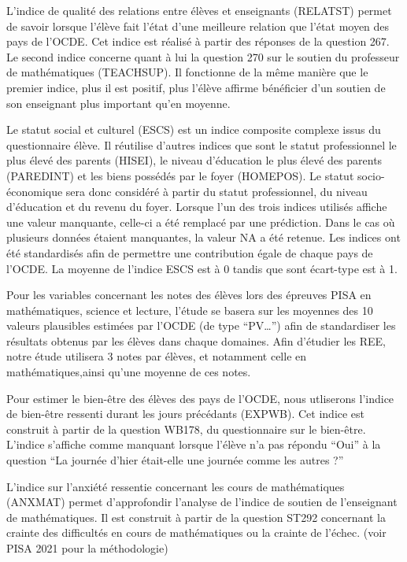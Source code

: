 \documentclass[
  french,
  11pt,
  a4paper,
  oneside]{report}
\begin{document}
L'indice de qualité des relations entre élèves et enseignants (RELATST)
permet de savoir lorsque l'élève fait l'état d'une meilleure relation
que l'état moyen des pays de l'OCDE. Cet indice est réalisé à partir des
réponses de la question 267. Le second indice concerne quant à lui la
question 270 sur le soutien du professeur de mathématiques (TEACHSUP).
Il fonctionne de la même manière que le premier indice, plus il est
positif, plus l'élève affirme bénéficier d'un soutien de son enseignant
plus important qu'en moyenne.

Le statut social et culturel (ESCS) est un indice composite complexe
issus du questionnaire élève. Il réutilise d'autres indices que sont le
statut professionnel le plus élevé des parents (HISEI), le niveau
d'éducation le plus élevé des parents (PAREDINT) et les biens possédés
par le foyer (HOMEPOS). Le statut socio-économique sera donc considéré à
partir du statut professionnel, du niveau d'éducation et du revenu du
foyer. Lorsque l'un des trois indices utilisés affiche une valeur
manquante, celle-ci a été remplacé par une prédiction. Dans le cas où
plusieurs données étaient manquantes, la valeur NA a été retenue. Les
indices ont été standardisés afin de permettre une contribution égale de
chaque pays de l'OCDE. La moyenne de l'indice ESCS est à 0 tandis que
sont écart-type est à 1.

Pour les variables concernant les notes des élèves lors des épreuves
PISA en mathématiques, science et lecture, l'étude se basera sur les
moyennes des 10 valeurs plausibles estimées par l'OCDE (de type
``PV\ldots{}'') afin de standardiser les résultats obtenus par les
élèves dans chaque domaines. Afin d'étudier les REE, notre étude
utilisera 3 notes par élèves, et notamment celle en mathématiques,ainsi
qu'une moyenne de ces notes.

Pour estimer le bien-être des élèves des pays de l'OCDE, nous utliserons
l'indice de bien-être ressenti durant les jours précédants (EXPWB). Cet
indice est construit à partir de la question WB178, du questionnaire sur
le bien-être. L'indice s'affiche comme manquant lorsque l'élève n'a pas
répondu ``Oui'' à la question ``La journée d'hier était-elle une journée
comme les autres ?''

L'indice sur l'anxiété ressentie concernant les cours de mathématiques
(ANXMAT) permet d'approfondir l'analyse de l'indice de soutien de
l'enseignant de mathématiques. Il est construit à partir de la question
ST292 concernant la crainte des difficultés en cours de mathématiques ou
la crainte de l'échec. (voir PISA 2021 pour la méthodologie)
\end{document}
